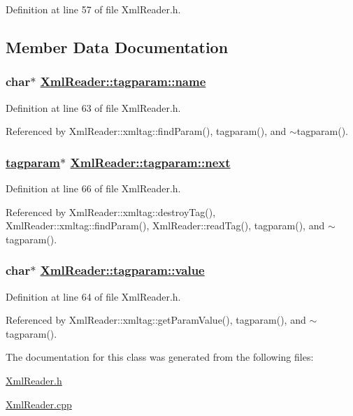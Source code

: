 Definition at line 57 of file Xml\-Reader.h.

\subsection{Member Data Documentation}
\hypertarget{classXmlReader_1_1tagparam_o0}{
\subsubsection[name]{\setlength{\rightskip}{0pt plus 5cm}char$\ast$ \hyperlink{classXmlReader_1_1tagparam_o0}{Xml\-Reader::tagparam::name}}}
\label{classXmlReader_1_1tagparam_o0}




Definition at line 63 of file Xml\-Reader.h.

Referenced by Xml\-Reader::xmltag::find\-Param(), tagparam(), and $\sim$tagparam().\hypertarget{classXmlReader_1_1tagparam_o2}{
\subsubsection[next]{\setlength{\rightskip}{0pt plus 5cm}\hyperlink{classXmlReader_1_1tagparam}{tagparam}$\ast$ \hyperlink{classXmlReader_1_1tagparam_o2}{Xml\-Reader::tagparam::next}}}
\label{classXmlReader_1_1tagparam_o2}




Definition at line 66 of file Xml\-Reader.h.

Referenced by Xml\-Reader::xmltag::destroy\-Tag(), Xml\-Reader::xmltag::find\-Param(), Xml\-Reader::read\-Tag(), tagparam(), and $\sim$tagparam().\hypertarget{classXmlReader_1_1tagparam_o1}{
\subsubsection[value]{\setlength{\rightskip}{0pt plus 5cm}char$\ast$ \hyperlink{classXmlReader_1_1tagparam_o1}{Xml\-Reader::tagparam::value}}}
\label{classXmlReader_1_1tagparam_o1}




Definition at line 64 of file Xml\-Reader.h.

Referenced by Xml\-Reader::xmltag::get\-Param\-Value(), tagparam(), and $\sim$tagparam().

The documentation for this class was generated from the following files:\begin{CompactItemize}
\item 
\hyperlink{XmlReader_8h}{Xml\-Reader.h}\item 
\hyperlink{XmlReader_8cpp}{Xml\-Reader.cpp}\end{CompactItemize}
